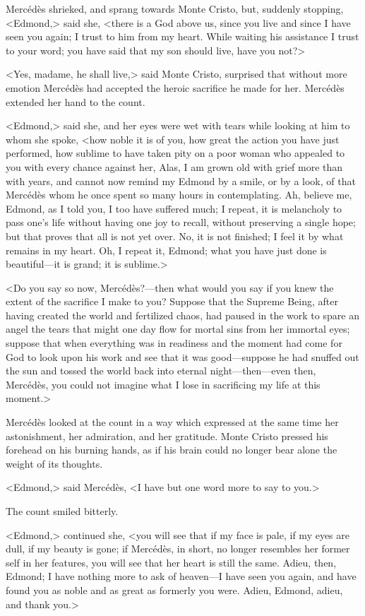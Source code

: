  Mercédès shrieked, and sprang towards Monte Cristo, but, suddenly stopping, <Edmond,> said she, <there is a God above us, since you live and since I have seen you again; I trust to him from my heart. While waiting his assistance I trust to your word; you have said that my son should live, have you not?> 

 <Yes, madame, he shall live,> said Monte Cristo, surprised that without more emotion Mercédès had accepted the heroic sacrifice he made for her. Mercédès extended her hand to the count. 

 <Edmond,> said she, and her eyes were wet with tears while looking at him to whom she spoke, <how noble it is of you, how great the action you have just performed, how sublime to have taken pity on a poor woman who appealed to you with every chance against her, Alas, I am grown old with grief more than with years, and cannot now remind my Edmond by a smile, or by a look, of that Mercédès whom he once spent so many hours in contemplating. Ah, believe me, Edmond, as I told you, I too have suffered much; I repeat, it is melancholy to pass one's life without having one joy to recall, without preserving a single hope; but that proves that all is not yet over. No, it is not finished; I feel it by what remains in my heart. Oh, I repeat it, Edmond; what you have just done is beautiful—it is grand; it is sublime.> 

 <Do you say so now, Mercédès?—then what would you say if you knew the extent of the sacrifice I make to you? Suppose that the Supreme Being, after having created the world and fertilized chaos, had paused in the work to spare an angel the tears that might one day flow for mortal sins from her immortal eyes; suppose that when everything was in readiness and the moment had come for God to look upon his work and see that it was good—suppose he had snuffed out the sun and tossed the world back into eternal night—then—even then, Mercédès, you could not imagine what I lose in sacrificing my life at this moment.> 

 Mercédès looked at the count in a way which expressed at the same time her astonishment, her admiration, and her gratitude. Monte Cristo pressed his forehead on his burning hands, as if his brain could no longer bear alone the weight of its thoughts. 

 <Edmond,> said Mercédès, <I have but one word more to say to you.> 

 The count smiled bitterly. 

 <Edmond,> continued she, <you will see that if my face is pale, if my eyes are dull, if my beauty is gone; if Mercédès, in short, no longer resembles her former self in her features, you will see that her heart is still the same. Adieu, then, Edmond; I have nothing more to ask of heaven—I have seen you again, and have found you as noble and as great as formerly you were. Adieu, Edmond, adieu, and thank you.> 

